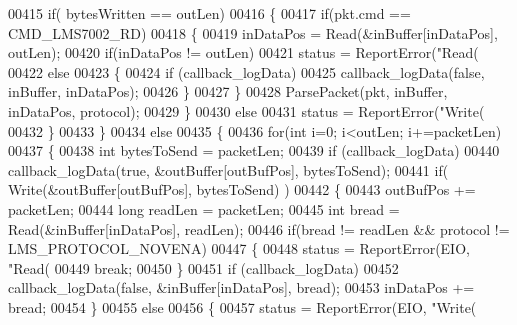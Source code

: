 \begin{DoxyCode}
{00415             \textcolor{keywordflow}{if}( bytesWritten == outLen)
00416             \{
00417                 \textcolor{keywordflow}{if}(pkt.cmd == CMD_LMS7002_RD)
00418                 \{
00419                     inDataPos = Read(&inBuffer[inDataPos], outLen);
00420                     \textcolor{keywordflow}{if}(inDataPos != outLen)
00421                         status = ReportError(\textcolor{stringliteral}{"Read(%
00422                     \textcolor{keywordflow}{else}
00423                     \{
00424                         \textcolor{keywordflow}{if} (callback_logData)
00425                             callback_logData(\textcolor{keyword}{false}, inBuffer, inDataPos);
00426                     \}
00427                 \}
00428                 ParsePacket(pkt, inBuffer, inDataPos, protocol);
00429             \}
00430             \textcolor{keywordflow}{else}
00431                 status = ReportError(\textcolor{stringliteral}{"Write(%
00432         \}
00433     \}
00434     \textcolor{keywordflow}{else}
00435     \{
00436         \textcolor{keywordflow}{for}(\textcolor{keywordtype}{int} i=0; i<outLen; i+=packetLen)
00437         \{
00438             \textcolor{keywordtype}{int} bytesToSend = packetLen;
00439             \textcolor{keywordflow}{if} (callback_logData)
00440                 callback_logData(\textcolor{keyword}{true}, &outBuffer[outBufPos], bytesToSend);
00441             \textcolor{keywordflow}{if}( Write(&outBuffer[outBufPos], bytesToSend) )
00442             \{
00443                 outBufPos += packetLen;
00444                 \textcolor{keywordtype}{long} readLen = packetLen;
00445                 \textcolor{keywordtype}{int} bread = Read(&inBuffer[inDataPos], readLen);
00446                 \textcolor{keywordflow}{if}(bread != readLen && protocol != LMS_PROTOCOL_NOVENA)
00447                 \{
00448                     status = ReportError(EIO, \textcolor{stringliteral}{"Read(%
00449                     \textcolor{keywordflow}{break};
00450                 \}
00451                 \textcolor{keywordflow}{if} (callback_logData)
00452                     callback_logData(\textcolor{keyword}{false}, &inBuffer[inDataPos], bread);
00453                 inDataPos += bread;
00454             \}
00455             \textcolor{keywordflow}{else}
00456             \{
00457                 status = ReportError(EIO, \textcolor{stringliteral}{"Write(%
}}}}}
\end{DoxyCode}
